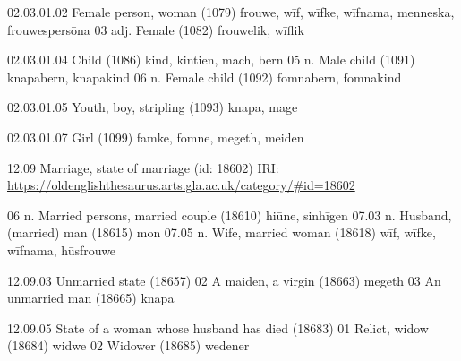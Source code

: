 	02.03.01.02 Female person, woman (1079)		frouwe, wīf, wīfke, wīfnama, menneska, 
				frouwespersōna
		03 adj. Female (1082)		frouwelik, wīflik

02.03.01.04 Child (1086)		kind, kintien, mach, bern
		05 n. Male child (1091)		knapabern, knapakind
		06 n. Female child (1092)		fomnabern, fomnakind

02.03.01.05 Youth, boy, stripling (1093)		knapa, mage

02.03.01.07 Girl (1099)		famke, fomne, megeth, meiden

	12.09 Marriage, state of marriage (id: 18602)
IRI: \url{https://oldenglishthesaurus.arts.gla.ac.uk/category/#id=18602}

06 n. Married persons, married couple (18610)		hiūne, sinhīgen
07.03 n. Husband, (married) man (18615)		mon
07.05 n. Wife, married woman (18618)		wīf, wīfke, wīfnama, hūsfrouwe
	
12.09.03 Unmarried state (18657)
		02 A maiden, a virgin (18663)		megeth
		03 An unmarried man (18665)		knapa

12.09.05 State of a woman whose husband has died (18683)
		01 Relict, widow (18684)		widwe
		02 Widower (18685)		wedener

